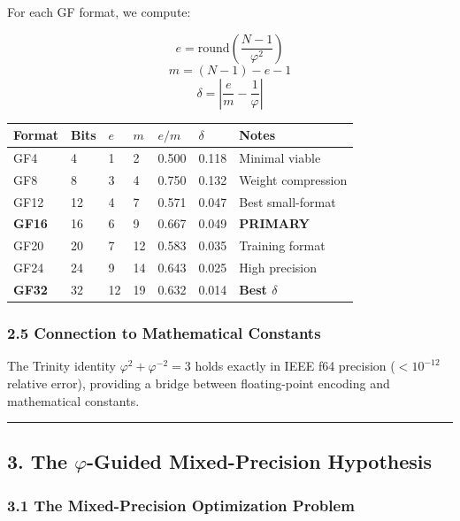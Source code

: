 For each GF format, we compute:

\[e = \text{round}\left(\frac{N-1}{\varphi^2}\right)\]
\[m = (N-1) - e - 1\]
\[\delta = \left|\frac{e}{m} - \frac{1}{\varphi}\right|\]

{\def\LTcaptype{none} %
\begin{longtable}[]{@{}lllllll@{}}
\toprule\noalign{}
Format & Bits & \(e\) & \(m\) & \(e/m\) & \(\delta\) & Notes \\
\midrule\noalign{}
\endhead
\bottomrule\noalign{}
\endlastfoot
GF4 & 4 & 1 & 2 & 0.500 & 0.118 & Minimal viable \\
GF8 & 8 & 3 & 4 & 0.750 & 0.132 & Weight compression \\
GF12 & 12 & 4 & 7 & 0.571 & 0.047 & Best small-format \\
\textbf{GF16} & 16 & 6 & 9 & 0.667 & 0.049 & \textbf{PRIMARY} \\
GF20 & 20 & 7 & 12 & 0.583 & 0.035 & Training format \\
GF24 & 24 & 9 & 14 & 0.643 & 0.025 & High precision \\
\textbf{GF32} & 32 & 12 & 19 & 0.632 & 0.014 & \textbf{Best
\(\delta\)} \\
\end{longtable}
}

\subsubsection{2.5 Connection to Mathematical
Constants}\label{connection-to-mathematical-constants}

The Trinity identity \(\varphi^2 + \varphi^{-2} = 3\) holds exactly in
IEEE f64 precision (\(< 10^{-12}\) relative error), providing a bridge
between floating-point encoding and mathematical constants.

\begin{center}\rule{0.5\linewidth}{0.5pt}\end{center}

\subsection{\texorpdfstring{3. The \(\varphi\)-Guided Mixed-Precision
Hypothesis}{3. The \textbackslash varphi-Guided Mixed-Precision Hypothesis}}\label{the-varphi-guided-mixed-precision-hypothesis}

\subsubsection{3.1 The Mixed-Precision Optimization
Problem}\label{the-mixed-precision-optimization-problem}

